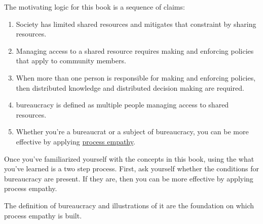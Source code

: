 The motivating logic for this book is a sequence of claims:
\begin{enumerate}
    \item Society has limited \glspl{shared resource} and mitigates that constraint by sharing resources.
    \item Managing access to a shared resource requires making and enforcing policies that apply to community members. 
    \item When more than one person is responsible for making and enforcing policies, then distributed knowledge and distributed decision making are required. 
    \item \Gls{bureaucracy} is defined as multiple people managing access to \glspl{shared resource}. 
    \item Whether you're a \gls{bureaucrat} or a subject of bureaucracy, you can be more effective by applying \hyperref[sec:process-empathy]{process empathy}.
\end{enumerate}

Once you've familiarized yourself with the concepts in this book, using the what you've learned is a two step process. First, ask yourself whether the conditions for bureaucracy are present. If they are, then you can be more effective by applying process empathy.

The definition of bureaucracy and illustrations of it are the foundation on which process empathy is built. 